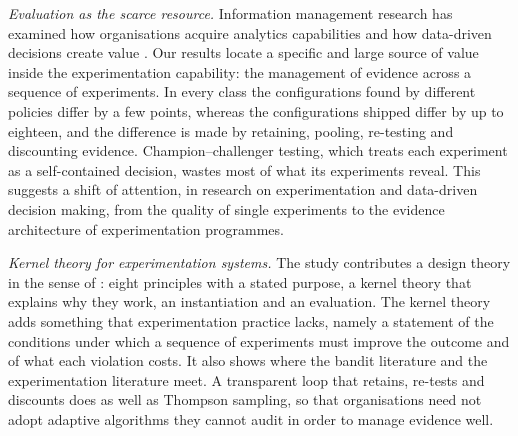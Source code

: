 \documentclass[preprint,12pt,authoryear]{elsarticle}
\theoremstyle{definition}
\begin{document}
\emph{Evaluation as the scarce resource.} Information management research has examined how organisations acquire analytics capabilities and how data-driven decisions create value \citep{gupta2016, mikalef2021, brynjolfsson2016}. Our results locate a specific and large source of value inside the experimentation capability: the management of evidence across a sequence of experiments. In every class the configurations found by different policies differ by a few points, whereas the configurations shipped differ by up to eighteen, and the difference is made by retaining, pooling, re-testing and discounting evidence. Champion--challenger testing, which treats each experiment as a self-contained decision, wastes most of what its experiments reveal. This suggests a shift of attention, in research on experimentation and data-driven decision making, from the quality of single experiments \citep{kohavi2020, fabijan2019} to the evidence architecture of experimentation programmes.

\emph{Kernel theory for experimentation systems.} The study contributes a design theory in the sense of \citet{gregor2007}: eight principles with a stated purpose, a kernel theory that explains why they work, an instantiation and an evaluation. The kernel theory adds something that experimentation practice lacks, namely a statement of the conditions under which a sequence of experiments must improve the outcome and of what each violation costs. It also shows where the bandit literature \citep{russo2018, scott2015} and the experimentation literature meet. A transparent loop that retains, re-tests and discounts does as well as Thompson sampling, so that organisations need not adopt adaptive algorithms they cannot audit in order to manage evidence well.
\end{document}
